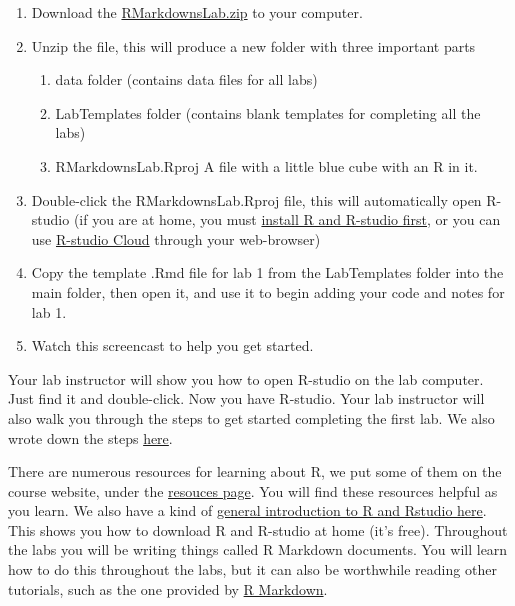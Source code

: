 \documentclass[]{book}
\providecommand{\tightlist}{%
  \setlength{\itemsep}{0pt}\setlength{\parskip}{0pt}}
\begin{document}
\begin{enumerate}
\def\labelenumi{\arabic{enumi}.}
\tightlist
\item
  Download the
  \href{https://github.com/CrumpLab/statisticsLab/raw/master/RMarkdownsLab.zip}{RMarkdownsLab.zip}
  to your computer.
\item
  Unzip the file, this will produce a new folder with three important
  parts

  \begin{enumerate}
  \def\labelenumii{\alph{enumii}.}
  \tightlist
  \item
    data folder (contains data files for all labs)
  \item
    LabTemplates folder (contains blank templates for completing all the
    labs)
  \item
    RMarkdownsLab.Rproj A file with a little blue cube with an R in it.
  \end{enumerate}
\item
  Double-click the RMarkdownsLab.Rproj file, this will automatically
  open R-studio (if you are at home, you must
  \href{https://crumplab.github.io/statisticsLab/software.html\#installing-r-and-r-studio}{install
  R and R-studio first}, or you can use
  \href{https://crumplab.github.io/statisticsLab/software.html\#r-studio-cloud}{R-studio
  Cloud} through your web-browser)
\item
  Copy the template .Rmd file for lab 1 from the LabTemplates folder
  into the main folder, then open it, and use it to begin adding your
  code and notes for lab 1.
\item
  Watch this screencast to help you get started.
\end{enumerate}

Your lab instructor will show you how to open R-studio on the lab
computer. Just find it and double-click. Now you have R-studio. Your lab
instructor will also walk you through the steps to get started
completing the first lab. We also wrote down the steps
\href{https://crumplab.github.io/statisticsLab/software.html\#how-to-complete-the-r-labs}{here}.

There are numerous resources for learning about R, we put some of them
on the course website, under the
\href{https://crumplab.github.io/psyc3400/Resources.html}{resouces
page}. You will find these resources helpful as you learn. We also have
a kind of
\href{https://crumplab.github.io/statisticsLab/software.html\#r}{general
introduction to R and Rstudio here}. This shows you how to download R
and R-studio at home (it's free). Throughout the labs you will be
writing things called R Markdown documents. You will learn how to do
this throughout the labs, but it can also be worthwhile reading other
tutorials, such as the one provided by
\href{https://rmarkdown.rstudio.com/lesson-1.html}{R Markdown}.
\end{document}
